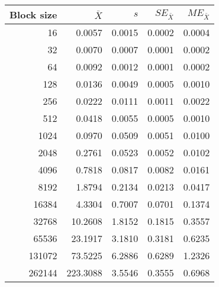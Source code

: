 \begin{tabular}{rrrrr}\toprule
{\small Block size} & $\bar{X}$ & $s$ & $SE_{\bar{X}}$ & $ME_{\bar{X}}$ \\\midrule
16 & 0.0057 & 0.0015 & 0.0002 & 0.0004\\
32 & 0.0070 & 0.0007 & 0.0001 & 0.0002\\
64 & 0.0092 & 0.0012 & 0.0001 & 0.0002\\
128 & 0.0136 & 0.0049 & 0.0005 & 0.0010\\
256 & 0.0222 & 0.0111 & 0.0011 & 0.0022\\
512 & 0.0418 & 0.0055 & 0.0005 & 0.0010\\
1024 & 0.0970 & 0.0509 & 0.0051 & 0.0100\\
2048 & 0.2761 & 0.0523 & 0.0052 & 0.0102\\
4096 & 0.7818 & 0.0817 & 0.0082 & 0.0161\\
8192 & 1.8794 & 0.2134 & 0.0213 & 0.0417\\
16384 & 4.3304 & 0.7007 & 0.0701 & 0.1374\\
32768 & 10.2608 & 1.8152 & 0.1815 & 0.3557\\
65536 & 23.1917 & 3.1810 & 0.3181 & 0.6235\\
131072 & 73.5225 & 6.2886 & 0.6289 & 1.2326\\
262144 & 223.3088 & 3.5546 & 0.3555 & 0.6968\\
\bottomrule
\end{tabular}
